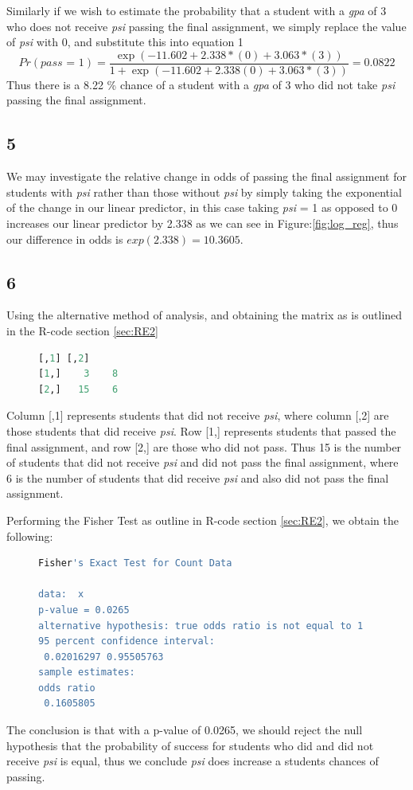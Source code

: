 \documentclass{article}
\begin{document}
    Similarly if we wish to estimate the probability that a student with a \textit{gpa} of 3 who does not receive \textit{psi} passing the final assignment, we simply replace the value of \textit{psi} with 0, and substitute this into equation 1
    \[
    Pr(\textit{pass = 1}) = \frac{\exp(-11.602 + 2.338*(0) + 3.063*(3))}{1 + \exp(-11.602 + 2.338(0) + 3.063*(3))} = 0.0822
    \]
    Thus there is a 8.22 \% chance of a student with a \textit{gpa} of 3 who did not take \textit{psi} passing the final assignment.
    \subsection*{5}
    We may investigate the relative change in odds of passing the final assignment for students with \textit{psi} rather than those without \textit{psi} by simply taking the exponential of the change in our linear predictor, in this case taking \textit{psi} = 1 as opposed to 0 increases our linear predictor by 2.338 as we can see in Figure:\ref{fig:log_reg}, thus our difference in odds is $exp(2.338) = 10.3605$.
    
    \subsection*{6}
    Using the alternative method of analysis, and obtaining the matrix as is outlined in the R-code section \ref{sec:RE2}
        	\begin{figure}[H]
    	\begin{lstlisting}[language=R]
     [,1] [,2]
[1,]    3    8
[2,]   15    6
    	\end{lstlisting}
    \end{figure}
    Column [,1] represents students that did not receive \textit{psi}, where column [,2] are those students that did receive \textit{psi}. Row [1,] represents students that passed the final assignment, and row [2,] are those who did not pass. Thus 15 is the number of students that did not receive \textit{psi} and did not pass the final assignment, where 6 is the number of students that did receive \textit{psi} and also did not pass the final assignment.
    
    Performing the Fisher Test as outline in R-code section \ref{sec:RE2}, we obtain the following:
            	\begin{figure}[H]
    	\begin{lstlisting}[language=R]
	Fisher's Exact Test for Count Data

data:  x
p-value = 0.0265
alternative hypothesis: true odds ratio is not equal to 1
95 percent confidence interval:
 0.02016297 0.95505763
sample estimates:
odds ratio 
 0.1605805 
    	\end{lstlisting}
    \end{figure}
    The conclusion is that with a p-value of 0.0265, we should reject the null hypothesis that the probability of success for students who did and did not receive \textit{psi} is equal, thus we conclude \textit{psi} does increase a students chances of passing.
\end{document}
